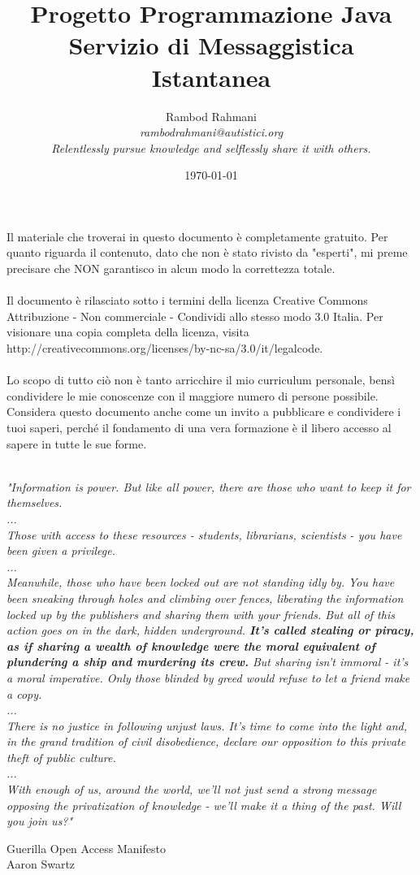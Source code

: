 \documentclass[a4paper, 11pt]{article} %
\title{\textbf{Progetto Programmazione Java}\\ %
Servizio di Messaggistica Istantanea} %
\author{Rambod Rahmani %
\\{\textit{rambodrahmani@autistici.org}}  %
\\{\textit{Relentlessly pursue knowledge and selflessly share it with others.}}\vspace{3mm}}
\date{\today} %
\begin{document}

Il materiale che troverai in questo documento \`e completamente gratuito. Per quanto riguarda il contenuto, dato che non \`e stato rivisto da "esperti", mi preme precisare che NON garantisco in alcun modo la correttezza totale.\\
\\
Il documento \`e rilasciato sotto i termini della licenza Creative Commons Attribuzione - Non commerciale - Condividi allo stesso modo 3.0 Italia. Per visionare una copia completa della licenza, visita \\
http://creativecommons.org/licenses/by-nc-sa/3.0/it/legalcode.\\
\\
Lo scopo di tutto ci\`o non \`e tanto arricchire il mio curriculum personale, bens\`i condividere le mie conoscenze con il maggiore numero di persone possibile. Considera questo documento anche come un invito a pubblicare e condividere i tuoi saperi, perch\'e il fondamento di una vera formazione \`e il libero accesso al sapere in tutte le sue forme.\\
\\
\begin{center}
\textit{"Information is power. But like all power, there are those who want to keep it for themselves.\\
...\\
Those with access to these resources - students, librarians, scientists - you have been given a privilege.\\
...\\
Meanwhile, those who have been locked out are not standing idly by. You have been sneaking through holes and climbing over fences, liberating the information locked up by the publishers and sharing them with your friends. But all of this action goes on in the dark, hidden underground. \textbf{It's called stealing or piracy, as if sharing a wealth of knowledge were the moral equivalent of plundering a ship and murdering its crew.} But sharing isn't immoral - it's a moral imperative. Only those blinded by greed would refuse to let a friend make a copy.\\
...\\
There is no justice in following unjust laws. It's time to come into the light and, in the grand tradition of civil disobedience, declare our opposition to this private theft of public culture.\\
...\\
With enough of us, around the world, we'll not just send a strong message opposing the privatization of knowledge - we'll make it a thing of the past. Will you join us?"\\}
\end{center}
\begin{flushright}
Guerilla Open Access Manifesto\\
Aaron Swartz
\end{flushright}
\end{document}
